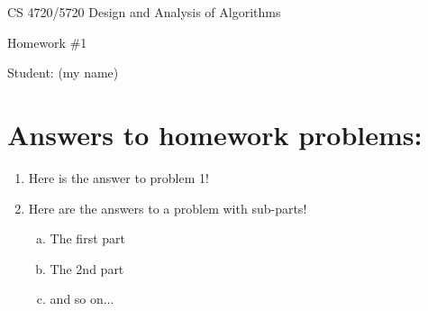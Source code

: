 \documentclass[11pt]{article}
\begin{document}
 

\rhead{\today}

\begin{center}\begin{Large}
CS 4720/5720 Design and Analysis of Algorithms

Homework \#1

Student: (my name)
\end{Large}
\end{center}


\section*{Answers to homework problems:}

\begin{enumerate}
	\item Here is the answer to problem 1!
	\item  Here are the answers to a problem with sub-parts!
	\begin{enumerate}[(a)]
		\item The first part
		\item The 2nd part
		\item and so on...
	\end{enumerate}
\end{enumerate}
\end{document}
